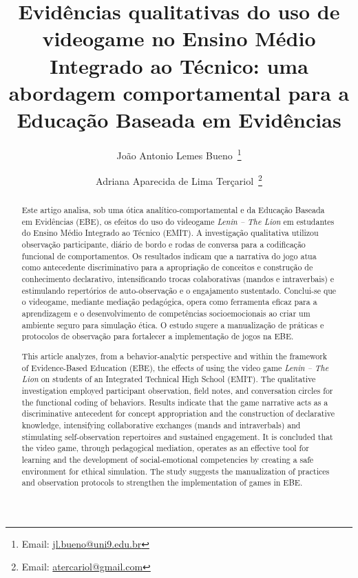 \documentclass[portuguese]{textolivre}
\title{Evidências qualitativas do uso de videogame no Ensino Médio Integrado ao Técnico: uma abordagem comportamental para a Educação Baseada em Evidências}
\author[1]{João Antonio Lemes Bueno~\orcid{0009-0002-4073-8934}\thanks{Email: \href{mailto:jl.bueno@uni9.edu.br}{jl.bueno@uni9.edu.br}}}
\author[1]{Adriana Aparecida de Lima Terçariol~\orcid{0000-0002-5824-2294}\thanks{Email: \href{mailto:atercariol@gmail.com}{atercariol@gmail.com}}}
\affil[1]{Universidade Nove de Julho, Programa de Pós-Graduação em Educação, SP, Brasil.}
\begin{document}
\maketitle

\begin{polyabstract}
\begin{abstract}
Este artigo analisa, sob uma ótica analítico-comportamental e da Educação Baseada em Evidências (EBE), os efeitos do uso do videogame \textit{Lenin – The Lion} \cite{bueno2019lenin} em estudantes do Ensino Médio Integrado ao Técnico (EMIT). A investigação qualitativa utilizou observação participante, diário de bordo e rodas de conversa para a codificação funcional de comportamentos. Os resultados indicam que a narrativa do jogo atua como antecedente discriminativo para a apropriação de conceitos e construção de conhecimento declarativo, intensificando trocas colaborativas (mandos e intraverbais) e estimulando repertórios de auto-observação e o engajamento sustentado. Conclui-se que o videogame, mediante mediação pedagógica, opera como ferramenta eficaz para a aprendizagem e o desenvolvimento de competências socioemocionais ao criar um ambiente seguro para simulação ética. O estudo sugere a manualização de práticas e protocolos de observação para fortalecer a implementação de jogos na EBE.

\end{abstract}

\begin{english} 
\begin{abstract}
This article analyzes, from a behavior-analytic perspective and within the framework of Evidence-Based Education (EBE), the effects of using the video game \textit{Lenin – The Lion} \cite{bueno2019lenin} on students of an Integrated Technical High School (EMIT). The qualitative investigation employed participant observation, field notes, and conversation circles for the functional coding of behaviors. Results indicate that the game narrative acts as a discriminative antecedent for concept appropriation and the construction of declarative knowledge, intensifying collaborative exchanges (mands and intraverbals) and stimulating self-observation repertoires and sustained engagement. It is concluded that the video game, through pedagogical mediation, operates as an effective tool for learning and the development of social-emotional competencies by creating a safe environment for ethical simulation. The study suggests the manualization of practices and observation protocols to strengthen the implementation of games in EBE.

\end{abstract}
\end{english}
\end{polyabstract}
\end{document}
